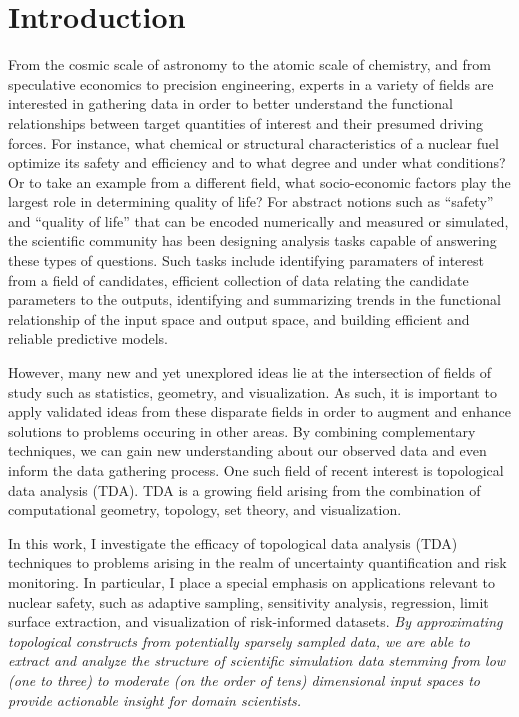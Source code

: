 
\chapter{Introduction}
\label{ch:introduction}
From the cosmic scale of astronomy to the atomic scale of chemistry, and from speculative economics to precision engineering, experts in a variety of fields are interested in gathering data in order to better understand the functional relationships between target quantities of interest and their presumed driving forces.
%
For instance, what chemical or structural characteristics of a nuclear fuel optimize its safety and efficiency and to what degree and under what conditions?
%
Or to take an example from a different field, what socio-economic factors play the largest role in determining quality of life?
%
For abstract notions such as ``safety'' and ``quality of life'' that can be encoded numerically and measured or simulated, the scientific community has been designing analysis tasks capable of answering these types of questions.
%
Such tasks include identifying paramaters of interest from a field of candidates, efficient collection of data relating the candidate parameters to the outputs, identifying and summarizing trends in the functional relationship of the input space and output space, and building efficient and reliable predictive models.

However, many new and yet unexplored ideas lie at the intersection of fields of study such as statistics, geometry, and visualization.
%
As such, it is important to apply validated ideas from these disparate fields in order to augment and enhance solutions to problems occuring in other areas.
%
By combining complementary techniques, we can gain new understanding about our observed data and even inform the data gathering process.
%
One such field of recent interest is topological data analysis (TDA).
%
TDA is a growing field arising from the combination of computational geometry, topology, set theory, and visualization.

In this work, I investigate the efficacy of topological data analysis (TDA) techniques to problems arising in the realm of uncertainty quantification and risk monitoring.
%
In particular, I place a special emphasis on applications relevant to nuclear safety, such as adaptive sampling, sensitivity analysis, regression, limit surface extraction, and visualization of risk-informed datasets.
%
\textit{By approximating topological constructs from potentially sparsely
sampled data, we are able to extract and analyze the structure of scientific simulation data stemming from low (one to three) to moderate (on the order of tens) dimensional input spaces to provide actionable insight for domain
scientists.}


